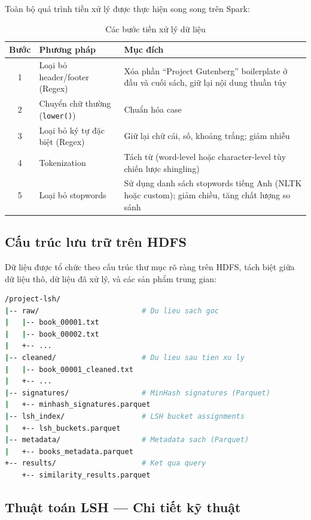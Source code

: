 Toàn bộ quá trình tiền xử lý được thực hiện song song trên Spark:

\begin{table}[h!]
\centering
\caption{Các bước tiền xử lý dữ liệu}
\label{tab:preprocessing}
\begin{tabularx}{\textwidth}{|c|l|X|}
\hline
\textbf{Bước} & \textbf{Phương pháp} & \textbf{Mục đích} \\
\hline
1 & Loại bỏ header/footer (Regex) & Xóa phần ``Project Gutenberg'' boilerplate ở đầu và cuối sách, giữ lại nội dung thuần túy \\
\hline
2 & Chuyển chữ thường (\texttt{lower()}) & Chuẩn hóa case \\
\hline
3 & Loại bỏ ký tự đặc biệt (Regex) & Giữ lại chữ cái, số, khoảng trắng; giảm nhiễu \\
\hline
4 & Tokenization & Tách từ (word-level hoặc character-level tùy chiến lược shingling) \\
\hline
5 & Loại bỏ stopwords & Sử dụng danh sách stopwords tiếng Anh (NLTK hoặc custom); giảm chiều, tăng chất lượng so sánh \\
\hline
\end{tabularx}
\end{table}

\subsection{Cấu trúc lưu trữ trên HDFS}

Dữ liệu được tổ chức theo cấu trúc thư mục rõ ràng trên HDFS, tách biệt giữa dữ liệu thô, dữ liệu đã xử lý, và các sản phẩm trung gian:

\begin{lstlisting}[style=CStyle, language=bash, caption={Cấu trúc thư mục trên HDFS}, label={lst:hdfs-structure}]
/project-lsh/
|-- raw/                        # Du lieu sach goc
|   |-- book_00001.txt
|   |-- book_00002.txt
|   +-- ...
|-- cleaned/                    # Du lieu sau tien xu ly
|   |-- book_00001_cleaned.txt
|   +-- ...
|-- signatures/                 # MinHash signatures (Parquet)
|   +-- minhash_signatures.parquet
|-- lsh_index/                  # LSH bucket assignments
|   +-- lsh_buckets.parquet
|-- metadata/                   # Metadata sach (Parquet)
|   +-- books_metadata.parquet
+-- results/                    # Ket qua query
    +-- similarity_results.parquet
\end{lstlisting}

\subsection{Thuật toán LSH --- Chi tiết kỹ thuật}

